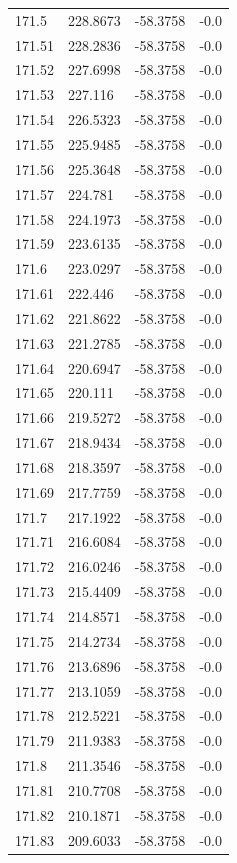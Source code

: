\begin{table}[H]
\begin{tabular}{llll}
171.5 & 228.8673 & -58.3758 & -0.0 \\
171.51 & 228.2836 & -58.3758 & -0.0 \\
171.52 & 227.6998 & -58.3758 & -0.0 \\
171.53 & 227.116 & -58.3758 & -0.0 \\
171.54 & 226.5323 & -58.3758 & -0.0 \\
171.55 & 225.9485 & -58.3758 & -0.0 \\
171.56 & 225.3648 & -58.3758 & -0.0 \\
171.57 & 224.781 & -58.3758 & -0.0 \\
171.58 & 224.1973 & -58.3758 & -0.0 \\
171.59 & 223.6135 & -58.3758 & -0.0 \\
171.6 & 223.0297 & -58.3758 & -0.0 \\
171.61 & 222.446 & -58.3758 & -0.0 \\
171.62 & 221.8622 & -58.3758 & -0.0 \\
171.63 & 221.2785 & -58.3758 & -0.0 \\
171.64 & 220.6947 & -58.3758 & -0.0 \\
171.65 & 220.111 & -58.3758 & -0.0 \\
171.66 & 219.5272 & -58.3758 & -0.0 \\
171.67 & 218.9434 & -58.3758 & -0.0 \\
171.68 & 218.3597 & -58.3758 & -0.0 \\
171.69 & 217.7759 & -58.3758 & -0.0 \\
171.7 & 217.1922 & -58.3758 & -0.0 \\
171.71 & 216.6084 & -58.3758 & -0.0 \\
171.72 & 216.0246 & -58.3758 & -0.0 \\
171.73 & 215.4409 & -58.3758 & -0.0 \\
171.74 & 214.8571 & -58.3758 & -0.0 \\
171.75 & 214.2734 & -58.3758 & -0.0 \\
171.76 & 213.6896 & -58.3758 & -0.0 \\
171.77 & 213.1059 & -58.3758 & -0.0 \\
171.78 & 212.5221 & -58.3758 & -0.0 \\
171.79 & 211.9383 & -58.3758 & -0.0 \\
171.8 & 211.3546 & -58.3758 & -0.0 \\
171.81 & 210.7708 & -58.3758 & -0.0 \\
171.82 & 210.1871 & -58.3758 & -0.0 \\
171.83 & 209.6033 & -58.3758 & -0.0 \\

\end{tabular}
\end{table}
